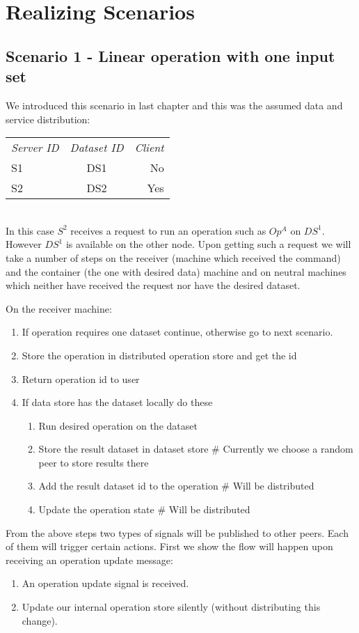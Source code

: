 \section{Realizing Scenarios}
\subsection{Scenario 1 - Linear operation with one input set}
We introduced this scenario in last chapter and this was the assumed data and service distribution:

\begin{tabular}{ l c r }
\em{Server ID} & \em{ Dataset ID} & \em{ Client} \\
S1 & DS1 & No \\
S2 & DS2 & Yes \\
\end{tabular}\\

In this case \(S^2\) receives a request to run an operation such as \(Op^A\) on \(DS^1\).
However \(DS^1\) is available on the other node.
Upon getting such a request we will take a number of steps on the receiver (machine which received the command)
and the container (the one with desired data) machine and on neutral machines which neither have received the
request nor have the desired dataset.

On the receiver machine:
\begin{enumerate}
\item If operation requires one dataset continue, otherwise go to next scenario.
\item Store the operation in distributed operation store and get the id
\item Return operation id to user
\item If data store has the dataset locally do these
  \begin{enumerate}
  \item Run desired operation on the dataset
  \item Store the result dataset in dataset store \# Currently we choose a random peer to store results there
  \item Add the result dataset id to the operation \# Will be distributed
  \item Update the operation state \# Will be distributed
  \end{enumerate}
\end{enumerate}

From the above steps two types of signals will be published to other peers. 
Each of them will trigger certain actions. 
First we show the flow will happen upon receiving an operation update message:
\begin{enumerate}
\item An operation update signal is received.
\item Update our internal operation store silently (without distributing this change).
\end{enumerate}

